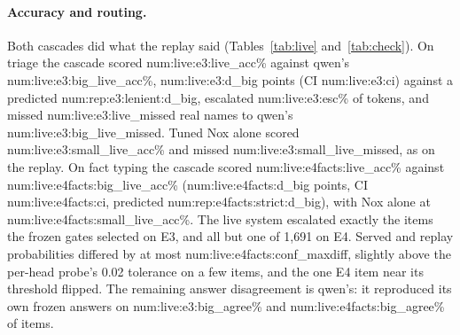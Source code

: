 \documentclass[11pt]{article}
\newcommand{\N}[1]{\csname num:#1\endcsname}
\begin{document}
\begin{table}[t]
\centering
\small
\setlength{\tabcolsep}{4pt}
\resizebox{\textwidth}{!}{}
\caption{Pre-registered replay predictions against the live run. ``Esc.\ agree'': items the live
cascade routed as the frozen gate on replay probabilities did. $\max|\Delta p|$: largest difference
between the served and the replay's first-stage probability over all items. ``Answers agree'': live
cascade answers equal to the replay's. ``qwen self-agree'': qwen's live answers equal to its frozen
ones, the floor on how well any prediction involving qwen can match. Latency error: composed
single-stream mean against measured.}
\label{tab:check}
\end{table}

\paragraph{Accuracy and routing.} Both cascades did what the replay said
(Tables~\ref{tab:live} and~\ref{tab:check}). On triage the cascade scored \N{live:e3:live_acc}\%
against qwen's \N{live:e3:big_live_acc}\%, \N{live:e3:d_big} points (CI \N{live:e3:ci}) against a
predicted \N{rep:e3:lenient:d_big}, escalated \N{live:e3:esc}\% of tokens, and missed
\N{live:e3:live_missed} real names to qwen's \N{live:e3:big_live_missed}. Tuned Nox alone scored
\N{live:e3:small_live_acc}\% and missed \N{live:e3:small_live_missed}, as on the replay. On fact typing
the cascade scored \N{live:e4facts:live_acc}\% against \N{live:e4facts:big_live_acc}\%
(\N{live:e4facts:d_big} points, CI \N{live:e4facts:ci}, predicted \N{rep:e4facts:strict:d_big}), with
Nox alone at \N{live:e4facts:small_live_acc}\%. The live system escalated exactly the items the frozen
gates selected on E3, and all but one of 1{,}691 on E4. Served and replay probabilities differed by
at most \N{live:e4facts:conf_maxdiff}, slightly above the per-head probe's 0.02 tolerance on a few
items, and the one E4 item near its threshold flipped. The remaining answer disagreement is qwen's:
it reproduced its own frozen answers on \N{live:e3:big_agree}\% and \N{live:e4facts:big_agree}\% of
items.
\end{document}
